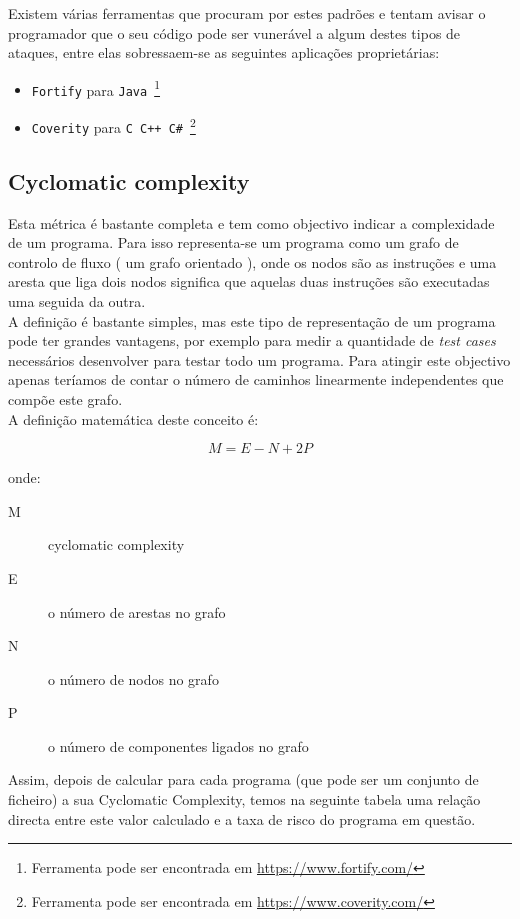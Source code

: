 Existem várias ferramentas que procuram por estes padrões e tentam avisar o programador que o seu código pode ser vunerável a algum destes tipos de ataques, 
entre elas sobressaem-se as seguintes aplicações proprietárias:

\begin{itemize}
\item \texttt{Fortify} para \texttt{Java}~\footnote{Ferramenta pode ser encontrada em \url{https://www.fortify.com/}}
\item \texttt{Coverity} para \texttt{C C++ C\#}~\footnote{Ferramenta pode ser encontrada em \url{https://www.coverity.com/}} 
\end{itemize}

\subsection{Cyclomatic complexity}
Esta métrica é bastante completa e tem como objectivo indicar a complexidade de um programa. Para isso representa-se um programa como um grafo de controlo de fluxo ( um grafo orientado ), onde os nodos são as instruções e uma aresta que liga dois nodos significa que aquelas duas instruções são executadas uma seguida da outra.\\
A definição é bastante simples, mas este tipo de representação de um programa pode ter grandes vantagens, por exemplo para medir a quantidade de \emph{test cases} necessários desenvolver para testar todo um programa. Para atingir este objectivo apenas teríamos de contar o número de caminhos linearmente independentes que compõe este grafo.\\

A definição matemática deste conceito é:

$$M = E - N + 2P$$

onde:

\begin{description}
\item[M] cyclomatic complexity
\item[E] o número de arestas no grafo
\item[N] o número de nodos no grafo
\item[P] o número de componentes ligados no grafo
\end{description}

Assim, depois de calcular para cada programa (que pode ser um conjunto de ficheiro) a sua Cyclomatic Complexity, temos na seguinte tabela uma relação directa
entre este valor calculado e a taxa de risco do programa em questão.

